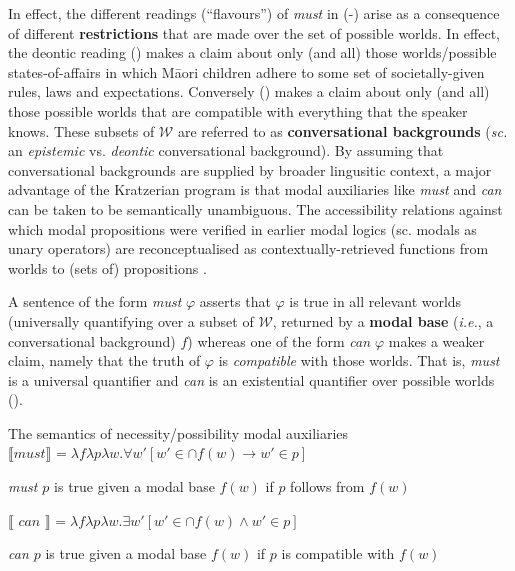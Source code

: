 \documentclass[12pt,dvipsnames]{report}
\providecommand{\denote}[2][]{\ensuremath{\llbracket{#2}\rrbracket^{#1}}}
\begin{document}
In effect, the different readings (``flavours'') of \textit{must} in (-) arise as a consequence of different \textbf{restrictions} that are made over the set of possible worlds. In effect, the deontic reading () makes a claim about only (and all) those worlds/possible states-of-affairs in which Māori children adhere to some set of societally-given rules, laws and expectations. Conversely () makes a claim about only (and all) those possible worlds that are compatible with everything that the speaker knows. These subsets of $ \mathcal W$ are referred to as \textbf{conversational backgrounds} (\textit{sc.} an \textit{epistemic} vs. \textit{deontic} conversational background). By assuming that conversational backgrounds are supplied by broader lingusitic context, a major advantage of the Kratzerian program is that modal auxiliaries like \textit{must} and \textit{can} can be taken to be semantically unambiguous. The accessibility relations against which modal propositions were verified in earlier modal logics (sc. modals as unary operators) are reconceptualised as contextually-retrieved functions from worlds to (sets of) propositions \citep*[see][]{Kaufmann2006}. 


 A sentence of the form \textit{must} $ \varphi $ asserts that $ \varphi $ is true in all relevant worlds (universally quantifying over a subset of $ \mathcal W $, returned by a \textbf{modal base} (\textit{i.e.}, a conversational background) $ f $) whereas one of the form \textit{can $ \varphi $} makes a weaker claim, namely that the truth of $ \varphi $ is \textit{compatible} with those worlds. That is, \textit{must} is a universal quantifier and \textit{can} is an existential quantifier over possible worlds (\nextx). %

\pex The semantics of necessity/possibility modal auxiliaries \citep[adapting from][346]{Kratzer1977}
\a $ \denote{\textit{must}}=\lambda f\lambda p\lambda w.\forall w'[w'\in\cap f(w)\to w'\in p] $

\textit{must $ p $} is true given a modal base $ f(w) $ if $ p $ follows from $ f(w) $


\a $ \denote{\textit{~can~}}=\lambda f\lambda p\lambda w.\exists w'[w'\in\cap f(w)\wedge w'\in p] $

\textit{can $ p $} is true given a modal base $ f(w) $ if $ p $ is compatible with $ f(w) $
\end{document}
